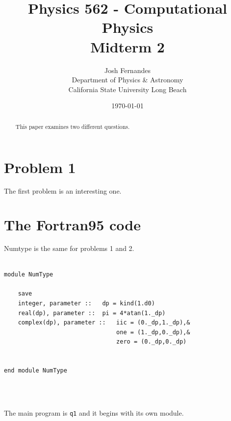 \documentclass[12pt]{article}
\begin{document}




\title{Physics 562 - Computational Physics\\[.5cm]
Midterm 2}
\author{Josh Fernandes\\
Department of Physics \& Astronomy\\
California State University Long Beach}
\date{\today}

  
\maketitle



\begin{abstract}
This paper examines two different questions. 
\end{abstract}

\section{Problem 1}\label{s:intro}
The first problem is an interesting one. 


\section{The Fortran95 code}

Numtype is the same for problems 1 and 2. 
\begin{lstlisting}[frame=single,caption={Module {\tt NumType}},label=module]

module NumType

	save
	integer, parameter :: 	dp = kind(1.d0)	
	real(dp), parameter :: 	pi = 4*atan(1._dp)
	complex(dp), parameter :: 	iic = (0._dp,1._dp),&	
								one = (1._dp,0._dp),&
								zero = (0._dp,0._dp)


end module NumType

\end{lstlisting}

\begin{lstlisting}[frame=single,caption={ {\tt q1.f95}},label=module]



\end{lstlisting}

The main program is {\tt q1} and it begins with its own module. 
\end{document}
